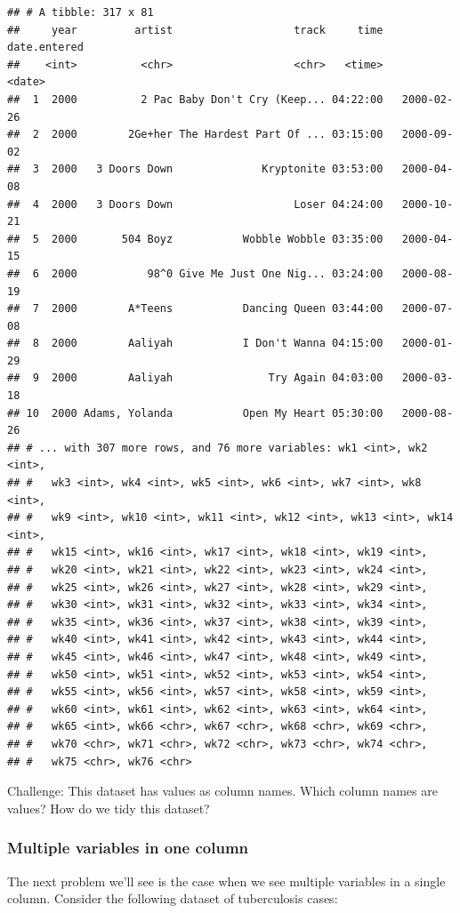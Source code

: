 \documentclass[]{article}
\theoremstyle{definition}
\theoremstyle{definition}
\theoremstyle{remark}
\begin{document}
\begin{verbatim}
## # A tibble: 317 x 81
##     year         artist                   track     time date.entered
##    <int>          <chr>                   <chr>   <time>       <date>
##  1  2000          2 Pac Baby Don't Cry (Keep... 04:22:00   2000-02-26
##  2  2000        2Ge+her The Hardest Part Of ... 03:15:00   2000-09-02
##  3  2000   3 Doors Down              Kryptonite 03:53:00   2000-04-08
##  4  2000   3 Doors Down                   Loser 04:24:00   2000-10-21
##  5  2000       504 Boyz           Wobble Wobble 03:35:00   2000-04-15
##  6  2000           98^0 Give Me Just One Nig... 03:24:00   2000-08-19
##  7  2000        A*Teens           Dancing Queen 03:44:00   2000-07-08
##  8  2000        Aaliyah           I Don't Wanna 04:15:00   2000-01-29
##  9  2000        Aaliyah               Try Again 04:03:00   2000-03-18
## 10  2000 Adams, Yolanda           Open My Heart 05:30:00   2000-08-26
## # ... with 307 more rows, and 76 more variables: wk1 <int>, wk2 <int>,
## #   wk3 <int>, wk4 <int>, wk5 <int>, wk6 <int>, wk7 <int>, wk8 <int>,
## #   wk9 <int>, wk10 <int>, wk11 <int>, wk12 <int>, wk13 <int>, wk14 <int>,
## #   wk15 <int>, wk16 <int>, wk17 <int>, wk18 <int>, wk19 <int>,
## #   wk20 <int>, wk21 <int>, wk22 <int>, wk23 <int>, wk24 <int>,
## #   wk25 <int>, wk26 <int>, wk27 <int>, wk28 <int>, wk29 <int>,
## #   wk30 <int>, wk31 <int>, wk32 <int>, wk33 <int>, wk34 <int>,
## #   wk35 <int>, wk36 <int>, wk37 <int>, wk38 <int>, wk39 <int>,
## #   wk40 <int>, wk41 <int>, wk42 <int>, wk43 <int>, wk44 <int>,
## #   wk45 <int>, wk46 <int>, wk47 <int>, wk48 <int>, wk49 <int>,
## #   wk50 <int>, wk51 <int>, wk52 <int>, wk53 <int>, wk54 <int>,
## #   wk55 <int>, wk56 <int>, wk57 <int>, wk58 <int>, wk59 <int>,
## #   wk60 <int>, wk61 <int>, wk62 <int>, wk63 <int>, wk64 <int>,
## #   wk65 <int>, wk66 <chr>, wk67 <chr>, wk68 <chr>, wk69 <chr>,
## #   wk70 <chr>, wk71 <chr>, wk72 <chr>, wk73 <chr>, wk74 <chr>,
## #   wk75 <chr>, wk76 <chr>
\end{verbatim}

Challenge: This dataset has values as column names. Which column names
are values? How do we tidy this dataset?

\subsubsection{Multiple variables in one
column}\label{multiple-variables-in-one-column}

The next problem we'll see is the case when we see multiple variables in
a single column. Consider the following dataset of tuberculosis cases:
\end{document}
